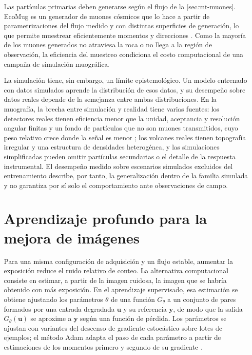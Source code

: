 Las partículas primarias deben generarse según el flujo de la \cref{sec:mt-muones}. EcoMug es un generador de muones cósmicos que lo hace a partir de parametrizaciones del flujo medido y con distintas superficies de generación, lo que permite muestrear eficientemente momentos y direcciones \parencite{pagano2021}. Como la mayoría de los muones generados no atraviesa la roca o no llega a la región de observación, la eficiencia del muestreo condiciona el costo computacional de una campaña de simulación muográfica.

La simulación tiene, sin embargo, un límite epistemológico. Un modelo entrenado con datos simulados aprende la distribución de esos datos, y su desempeño sobre datos reales depende de la semejanza entre ambas distribuciones. En la muografía, la brecha entre simulación y realidad tiene varias fuentes: los detectores reales tienen eficiencia menor que la unidad, aceptancia y resolución angular finitas y un fondo de partículas que no son muones transmitidos, cuyo peso relativo crece donde la señal es menor \parencite{lesparre2010,lechmann2021}; los volcanes reales tienen topografía irregular y una estructura de densidades heterogénea, y las simulaciones simplificadas pueden omitir partículas secundarias o el detalle de la respuesta instrumental. El desempeño medido sobre escenarios simulados excluidos del entrenamiento describe, por tanto, la generalización dentro de la familia simulada y no garantiza por sí solo el comportamiento ante observaciones de campo.

\section{Aprendizaje profundo para la mejora de imágenes}
\label{sec:mt-aprendizaje}

Para una misma configuración de adquisición y un flujo estable, aumentar la exposición reduce el ruido relativo de conteo. La alternativa computacional consiste en estimar, a partir de la imagen ruidosa, la imagen que se habría obtenido con más exposición. En el aprendizaje supervisado, esa estimación se obtiene ajustando los parámetros $\theta$ de una función $G_\theta$ a un conjunto de pares formados por una entrada degradada $\boldsymbol u$ y su referencia $\boldsymbol y$, de modo que la salida $G_\theta(\boldsymbol u)$ se aproxime a $\boldsymbol y$ según una función de pérdida. Los parámetros se ajustan con variantes del descenso de gradiente estocástico sobre lotes de ejemplos; el método Adam adapta el paso de cada parámetro a partir de estimaciones de los momentos primero y segundo de su gradiente \parencite{kingma2015}.

